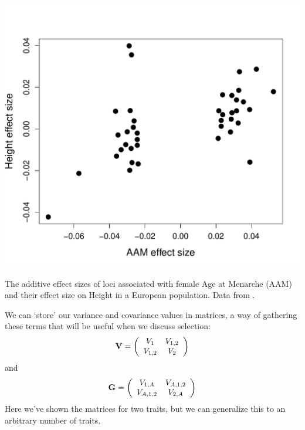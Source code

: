 \begin{marginfigure}
\begin{center}
\includegraphics[width= \textwidth]{Journal_figs/Quant_gen/pickrell_pleiotropy/AAM_height.pdf}
\end{center}
\caption{The additive effect sizes of loci associated with female Age
  at Menarche (AAM) and their effect size on Height in a European
  population. Data from \citet{pickrell2016detection}. } \label{fig:AAM_height}   
\end{marginfigure}

We can `store' our variance and covariance values in matrices, a way of gathering these terms that will be useful when we discuss selection: 
\begin{equation}
\bf{V}= \left( \begin{array}{cc} 
V_{1} & V_{1,2} \\
V_{1,2} & V_{2} \\
\end{array} \right) \label{P_matrix}
\end{equation}
and
\begin{equation}
\bf{G}= \left( \begin{array}{cc} 
V_{1,A} & V_{A,1,2} \\
V_{A,1,2} & V_{2,A} \\
\end{array} \right)  \label{G_matrix}
\end{equation}
Here we've shown the matrices for two traits, but we can generalize this to an arbitrary number of traits.

